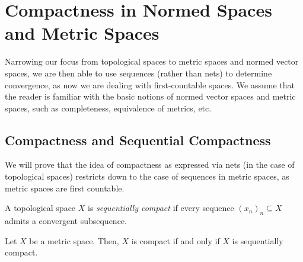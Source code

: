 \documentclass[10pt]{mypackage}
\begin{document}
\section{Compactness in Normed Spaces and Metric Spaces}%
Narrowing our focus from topological spaces to metric spaces and normed vector spaces, we are then able to use sequences (rather than nets) to determine convergence, as now we are dealing with first-countable spaces. We assume that the reader is familiar with the basic notions of normed vector spaces and metric spaces, such as completeness, equivalence of metrics, etc.
\subsection{Compactness and Sequential Compactness}%
We will prove that the idea of compactness as expressed via nets (in the case of topological spaces) restricts down to the case of sequences in metric spaces, as metric spaces are first countable.
\begin{definition}
  A topological space $X$ is \textit{sequentially compact} if every sequence $\left( x_n \right)_n\subseteq X$ admits a convergent subsequence.
\end{definition}
\begin{theorem}
  Let $X$ be a metric space. Then, $X$ is compact if and only if $X$ is sequentially compact.
\end{theorem}
\end{document}
